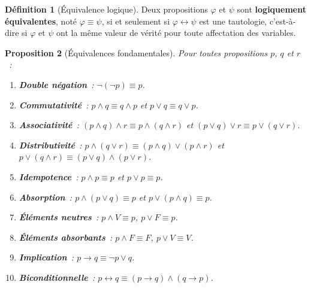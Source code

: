 \documentclass[12pt,a4paper,openany]{book}
\theoremstyle{definition}
\newtheorem{definition}{Définition}[chapter]
\theoremstyle{plain}
\newtheorem{proposition}[definition]{Proposition}
\theoremstyle{remark}
\begin{document}
\begin{definition}[\'Equivalence logique]\label{def:equiv-logique}
  Deux propositions $\varphi$ et $\psi$ sont \textbf{logiquement \'equivalentes}, not\'e $\varphi \equiv \psi$, si et seulement si $\varphi \leftrightarrow \psi$ est une tautologie, c'est-\`a-dire si $\varphi$ et $\psi$ ont la m\^eme valeur de v\'erit\'e pour toute affectation des variables.
\end{definition}

\begin{proposition}[\'Equivalences fondamentales]\label{prop:equiv-fondamentales}
  Pour toutes propositions $p$, $q$ et $r$~:
  \begin{enumerate}[label=(\roman*)]
    \item \textbf{Double n\'egation}~: $\neg(\neg p) \equiv p$.
    \item \textbf{Commutativit\'e}~: $p \land q \equiv q \land p$ \quad et \quad $p \lor q \equiv q \lor p$.
    \item \textbf{Associativit\'e}~: $(p \land q) \land r \equiv p \land (q \land r)$ \quad et \quad $(p \lor q) \lor r \equiv p \lor (q \lor r)$.
    \item \textbf{Distributivit\'e}~: $p \land (q \lor r) \equiv (p \land q) \lor (p \land r)$ \quad et \quad $p \lor (q \land r) \equiv (p \lor q) \land (p \lor r)$.
    \item \textbf{Idempotence}~: $p \land p \equiv p$ \quad et \quad $p \lor p \equiv p$.
    \item \textbf{Absorption}~: $p \land (p \lor q) \equiv p$ \quad et \quad $p \lor (p \land q) \equiv p$.
    \item \textbf{\'El\'ements neutres}~: $p \land V \equiv p$, \quad $p \lor F \equiv p$.
    \item \textbf{\'El\'ements absorbants}~: $p \land F \equiv F$, \quad $p \lor V \equiv V$.
    \item \textbf{Implication}~: $p \to q \equiv \neg p \lor q$.
    \item \textbf{Biconditionnelle}~: $p \leftrightarrow q \equiv (p \to q) \land (q \to p)$.
  \end{enumerate}
\end{proposition}
\end{document}
